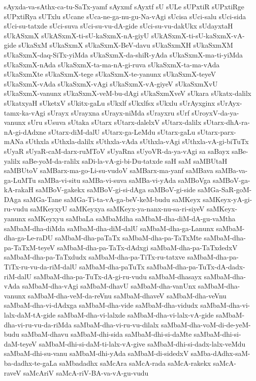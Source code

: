 {sAyxda-va-sAthx-ca-tu-SaTx-yamf
sAyxmf
sAyxtf
sU
sULe
sUPxtiR
sUPxtiRge
sUPxtiRya
sUTxlu
sUcane
sUca-ne-ga-nu-gu-Na-vAgi
sUcisa
sUci-salu
sUci-sida
sUci-su-tatxde
sUci-suva
sUci-su-vu-dA-gide
sUci-su-vu-dakUkx
sUdayxtaH
sUkASxmX
sUkASxmX-ti-sU-kaSxmX-nA-giyU
sUkASxmX-ti-sU-kaSxmX-vA-gide
sUkaSxM
sUkaSxmX
sUkaSxmX-BeV-davu
sUkaSxmXH
sUkaSxmXM
sUkaSxmX-daq-SiTx-yiMda
sUkaSxmX-da-shiR-yAda
sUkaSxmX-ma-ti-yiMda
sUkaSxmX-nAda
sUkaSxmX-ta-ma-nA-gi-ruva
sUkaSxmX-ta-ma-vAda
sUkaSxmXte
sUkaSxmX-tege
sUkaSxmX-te-yanunx
sUkaSxmX-teyeV
sUkaSxmX-vAda
sUkaSxmX-vAgi
sUkaSxmX-vA-giyeV
sUkaSxmXvU
sUkaSxmX-vanunx
sUkaSxmX-veM-bu-dAgi
sUkaSxmXveV
sUkara
sUkatx-dalilx
sUkatxyaH
sUketxV
sUkitx-gaLu
sUkxlf
sUkxlfsx
sUkxlu
sUrAyxginx
sUrAyx-tamx-ka-vAgi
sUrayx
sUrayxna
sUrayx-niMda
sUrayxru
sUrf
sUroyxV-da-ya-vanunx
sUru
sUsuva
sUtaka
sUtarx
sUtarx-dalelxV
sUtarx-dalilx
sUtarx-dhA-ra-nA-gi-dAdxne
sUtarx-diM-dalU
sUtarx-ga-LeMdu
sUtarx-gaLu
sUtarx-parx-mANa
sUthxla
sUthxla-dalilx
sUthxla-vAda
sUthxla-vAgi
sUthxla-vA-gi-biTuTx
sUyaR
sUyaR-caM-darx-ruMToV
sUyaRna
sUyoVR-da-ya-vAgi
sa
saBayx
saBe-yalilx
saBe-yoM-da-ralilx
saDi-la-vA-gi-bi-Du-tatxde
saH
saM
saMBUtaH
saMBUtoV
saMBarx-ma-go-Li-su-vudoV
saMBarx-ma-yanf
saMBava
saMBa-va-ga-LuMTu
saMBa-vi-situ
saMBa-vi-suva
saMBa-vi-yAda
saMBoVga
saMBoV-ga-kA-rakaH
saMBoV-gakekx
saMBoV-gi-si-dAga
saMBoV-gi-side
saMGa-SaR-goM-DAga
saMGa-Tane
saMGa-Ti-ta-vA-ga-beV-keM-budu
saMKeyx
saMKeyx-yA-gi-ru-vudu
saMKeyxyU
saMKeyxya
saMKeyx-ya-nanx-nu-sa-ri-siyeV
saMKeyx-yanunx
saMKeyxyu
saMbaLa
saMbaMdha
saMbaM-dha-diM-dA-gu-vaMtha
saMbaM-dha-diMda
saMbaM-dha-diM-dalU
saMbaM-dha-ga-Lanunx
saMbaM-dha-ga-Le-raDU
saMbaM-dha-paTaTx
saMbaM-dha-pa-TaTxMte
saMbaM-dha-pa-TaTxM-teyeV
saMbaM-dha-pa-TaTx-dAdxgi
saMbaM-dha-pa-TaTxdedxV
saMbaM-dha-pa-TaTxdudx
saMbaM-dha-pa-TiTx-ru-tatxve
saMbaM-dha-pa-TiTx-ru-vu-da-riM-dalU
saMbaM-dha-paTuTx
saMbaM-dha-pa-TuTx-dA-dadx-riM-dalU
saMbaM-dha-pa-TuTx-dA-gi-ru-vudu
saMbaM-dhasayx
saMbaM-dha-vAda
saMbaM-dha-vAgi
saMbaM-dhavU
saMbaM-dha-vanUnx
saMbaM-dha-vanunx
saMbaM-dha-veM-da-reVnu
saMbaM-dhaveV
saMbaM-dha-veVnu
saMbaM-dha-vi-dAdxga
saMbaM-dha-vide
saMbaM-dha-vidudx
saMbaM-dha-vi-lalx-daM-tA-gide
saMbaM-dha-vi-lalxde
saMbaM-dha-vi-lalx-vA-gide
saMbaM-dha-vi-ru-vu-da-riMda
saMbaM-dha-vi-ru-vu-dilalx
saMbaM-dha-voM-di-de-yeM-budu
saMbaM-dhavu
saMbaM-dhi-sida
saMbaM-dhi-si-daMte
saMbaM-dhi-si-daM-teyeV
saMbaM-dhi-si-daM-ti-lalx-vA-give
saMbaM-dhi-si-dadx-lalx-veMdu
saMbaM-dhi-su-vanu
saMbaM-dhi-yAda
saMbaM-di-sidedxV
saMba-dAdhx-saM-ba-dadhx-te-gaLa
saMbadadhx
saMcAra
saMcA-rada
saMcA-rakekx
saMcA-raveV
saMcAriV
saMcA-riV-BA-va-vA-gu-vudu
}

